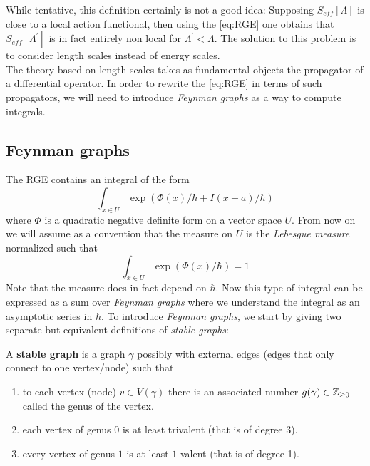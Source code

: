 While tentative, this definition certainly is not a good idea: Supposing $S_{eff}[\Lambda]$ is close to a local action functional, then using the \ref{eq:RGE} one obtains that $S_{eff}[\Lambda^\prime]$ is in fact entirely non local for $\Lambda^\prime < \Lambda$. The solution to this problem is to consider length scales instead of energy scales.\\

The theory based on length scales takes as fundamental objects the propagator of a differential operator. In order to rewrite the \ref{eq:RGE} in terms of such propagators, we will need to introduce \emph{Feynman graphs} as a way to compute integrals.

\subsection{Feynman graphs}
\label{subsec:feynmann_graphs}

The RGE contains an integral of the form
$$ \int_{x \in U} \exp(\Phi(x)/\hbar + I(x+a)/\hbar) $$
where $\Phi$ is a quadratic negative definite form on a vector space $U$. From now on we will assume as a convention that the measure on $U$ is the \emph{Lebesgue measure} normalized such that
$$ \int_{x \in U} \exp(\Phi(x)/\hbar) = 1 $$
Note that the measure does in fact depend on $\hbar$. Now this type of integral can be expressed as a sum over \emph{Feynman graphs} where we understand the integral as an asymptotic series in $\hbar$. To introduce \emph{Feynman graphs}, we start by giving two separate but equivalent definitions of \emph{stable graphs}:

\begin{definition}
  A \textbf{stable graph} is a graph $\gamma$ possibly with external edges (edges that only connect to one vertex/node) such that
  \begin{enumerate}
    \item to each vertex (node) $v \in V(\gamma)$ there is an associated number $g(\gamma) \in \mathbb{Z}_{\geq 0}$ called the genus of the vertex.

    \item each vertex of genus $0$ is at least trivalent (that is of degree 3).

    \item every vertex of genus $1$ is at least $1$-valent (that is of degree 1).
  \end{enumerate}
\end{definition}


